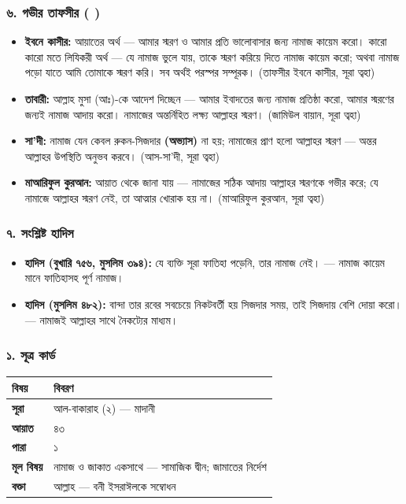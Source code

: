 \subsubsection*{৬. গভীর তাফসীর ( )}

\begin{itemize}
\item \textbf{ইবনে কাসীর:} আয়াতের অর্থ — আমার স্মরণ ও আমার প্রতি ভালোবাসার জন্য নামাজ কায়েম করো। কারো কারো মতে লিযিকরী অর্থ — যে নামাজ ভুলে যায়, তাকে স্মরণ করিয়ে দিতে নামাজ কায়েম করো; অথবা নামাজ পড়ো যাতে আমি তোমাকে স্মরণ করি। সব অর্থই পরস্পর সম্পূরক। (তাফসীর ইবনে কাসীর, সূরা ত্বহা)
\item \textbf{তাবারী:} আল্লাহ মুসা (আঃ)-কে আদেশ দিচ্ছেন — আমার ইবাদতের জন্য নামাজ প্রতিষ্ঠা করো, আমার স্মরণের জন্যই নামাজ আদায় করো। নামাজের অন্তর্নিহিত লক্ষ্য আল্লাহর স্মরণ। (জামিউল বায়ান, সূরা ত্বহা)
\item \textbf{সা'দী:} নামাজ যেন কেবল রুকন-সিজদার \textbf{ (অভ্যাস)} না হয়; নামাজের প্রাণ হলো আল্লাহর স্মরণ — অন্তর আল্লাহর উপস্থিতি অনুভব করবে। (আস-সা'দী, সূরা ত্বহা)
\item \textbf{মাআরিফুল কুরআন:} আয়াত থেকে জানা যায় — নামাজের সঠিক আদায় আল্লাহর স্মরণকে গভীর করে; যে নামাজে আল্লাহর স্মরণ নেই, তা আত্মার খোরাক হয় না। (মাআরিফুল কুরআন, সূরা ত্বহা)
\end{itemize}
\subsubsection*{৭. সংশ্লিষ্ট হাদিস}

\begin{itemize}
\item \textbf{হাদিস (বুখারি ৭৫৬, মুসলিম ৩৯৪):} যে ব্যক্তি সূরা ফাতিহা পড়েনি, তার নামাজ নেই। — নামাজ কায়েম মানে ফাতিহাসহ পূর্ণ নামাজ।
\item \textbf{হাদিস (মুসলিম ৪৮২):} বান্দা তার রবের সবচেয়ে নিকটবর্তী হয় সিজদার সময়, তাই সিজদায় বেশি দোয়া করো। — নামাজই আল্লাহর সাথে নৈকট্যের মাধ্যম।
\end{itemize}
\subsubsection*{১. সূত্র কার্ড}

\begin{table}[h]\centering\small
\begin{tabular}{ll}
বিষয় & বিবরণ \\
\hline
\textbf{সূরা} & আল-বাকারাহ (২) — মাদানী \\
\textbf{আয়াত} & ৪৩ \\
\textbf{পারা} & ১ \\
\textbf{মূল বিষয়} & নামাজ ও জাকাত একসাথে — সামাজিক দ্বীন; জামাতের নির্দেশ \\
\textbf{বক্তা} & আল্লাহ — বনী ইসরাঈলকে সম্বোধন \\
\hline
\end{tabular}
\end{table}


